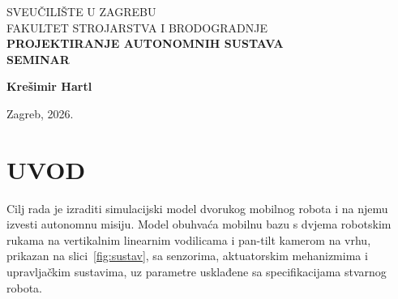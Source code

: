 \documentclass[12pt,a4paper]{article}
\begin{document}
\begin{titlepage}
    \thispagestyle{empty}
    \centering
    {\fontsize{16pt}{19pt}\selectfont SVEUČILIŠTE U ZAGREBU\\}
    {\fontsize{16pt}{19pt}\selectfont FAKULTET STROJARSTVA I BRODOGRADNJE\\}
    \vfill
    {\fontsize{28pt}{34pt}\selectfont\bfseries PROJEKTIRANJE AUTONOMNIH SUSTAVA\\}
    \vspace{0.5cm}
    {\fontsize{28pt}{34pt}\selectfont\bfseries SEMINAR\\}
    \vfill
    \noindent
    \begin{flushright}
        {\fontsize{14pt}{17pt}\selectfont\bfseries Krešimir Hartl\\}
    \end{flushright}
    \vspace{1cm}
    \begin{center}
        {\fontsize{14pt}{17pt}\selectfont Zagreb, 2026.}
    \end{center}
\end{titlepage}


\tableofcontents
\newpage
\listoffigures
\newpage
\listoftables
\newpage


\section{UVOD}

Cilj rada je izraditi simulacijski model dvorukog mobilnog robota i na njemu izvesti
autonomnu misiju. Model obuhvaća mobilnu bazu s dvjema robotskim rukama na vertikalnim
linearnim vodilicama i pan-tilt kamerom na vrhu, prikazan na slici~\ref{fig:sustav}, sa
senzorima, aktuatorskim mehanizmima i upravljačkim sustavima, uz parametre usklađene sa
specifikacijama stvarnog robota.
\end{document}
